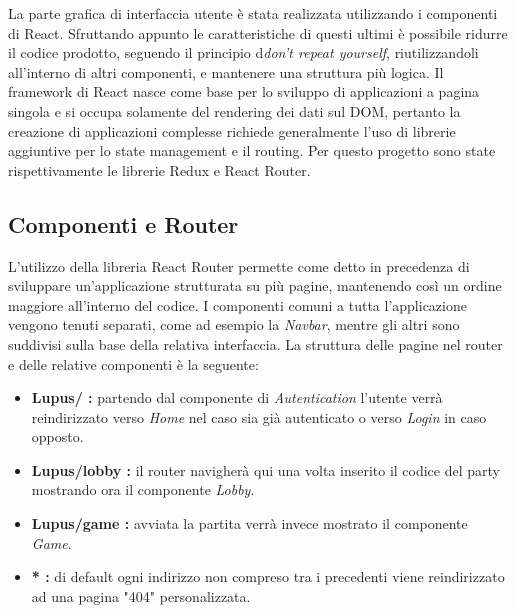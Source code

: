 La parte grafica di interfaccia utente è stata realizzata utilizzando i componenti di React.
Sfruttando appunto le caratteristiche di questi ultimi è possibile ridurre il codice prodotto, seguendo il principio d\emph{don't repeat yourself}, riutilizzandoli all'interno di altri componenti, e mantenere una struttura più logica.
Il framework di React nasce come base per lo sviluppo di applicazioni a pagina singola e si occupa solamente del rendering dei dati sul DOM, pertanto la creazione di applicazioni complesse richiede generalmente l'uso di librerie aggiuntive per lo state management e il routing\cite{reactweb}. Per questo progetto sono state rispettivamente le librerie Redux e React Router.

\subsection{Componenti e Router}
L'utilizzo della libreria React Router permette come detto in precedenza di sviluppare un'applicazione strutturata su più pagine, mantenendo così un ordine maggiore all'interno del codice. I componenti comuni a tutta l'applicazione vengono tenuti separati, come ad esempio la \emph{Navbar}, mentre gli altri sono suddivisi sulla base della relativa interfaccia. La struttura delle pagine nel router e delle relative componenti è la seguente:

\begin{itemize}
    \item \textbf{Lupus/ :} partendo dal componente di \emph{Autentication} l'utente verrà reindirizzato verso \emph{Home} nel caso sia già autenticato o verso \emph{Login} in caso opposto.
    \item \textbf{Lupus/lobby :} il router navigherà qui una volta inserito il codice del party mostrando ora il componente \emph{Lobby}.
    \item \textbf{Lupus/game :} avviata la partita verrà invece mostrato il componente \emph{Game}.
    \item \textbf{* :} di default ogni indirizzo non compreso tra i precedenti viene reindirizzato ad una pagina "404" personalizzata.
\end{itemize}

